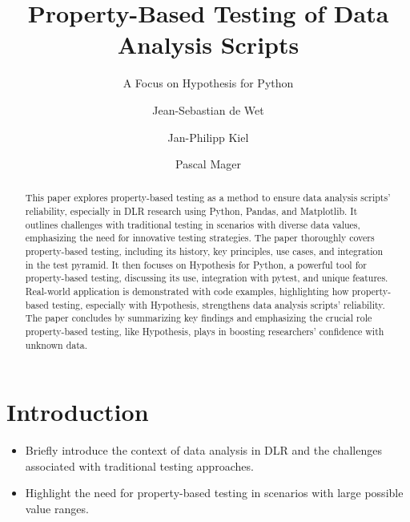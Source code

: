 \documentclass[runningheads]{llncs}
\begin{document}
%
\title{Property-Based Testing of Data Analysis Scripts}
\subtitle{A Focus on Hypothesis for Python}
%
%
\author{Jean-Sebastian de Wet \and
Jan-Philipp Kiel \and
Pascal Mager}
%
%
%
\maketitle              %
%
\begin{abstract}
This paper explores property-based testing as a method to ensure data analysis scripts' reliability, especially in DLR research using Python, Pandas, and Matplotlib. It outlines challenges with traditional testing in scenarios with diverse data values, emphasizing the need for innovative testing strategies. The paper thoroughly covers property-based testing, including its history, key principles, use cases, and integration in the test pyramid. It then focuses on Hypothesis for Python, a powerful tool for property-based testing, discussing its use, integration with pytest, and unique features. Real-world application is demonstrated with code examples, highlighting how property-based testing, especially with Hypothesis, strengthens data analysis scripts' reliability. The paper concludes by summarizing key findings and emphasizing the crucial role property-based testing, like Hypothesis, plays in boosting researchers' confidence with unknown data.

\end{abstract}
%
%
%
\section{Introduction}
\begin{itemize}
  \item Briefly introduce the context of data analysis in DLR and the challenges associated with traditional testing approaches.
  \item Highlight the need for property-based testing in scenarios with large possible value ranges.\cite{MacIver2019}
\end{itemize}
\end{document}
